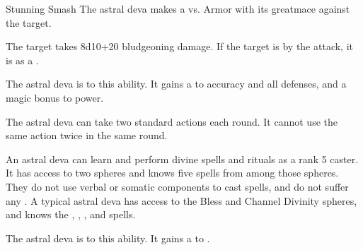     \begin{freeability}{Stunning Smash}
       The astral deva makes a 
         vs. Armor
        with its greatmace against the target.
    
    \hit The target takes 8d10+20 bludgeoning damage. If the target is  by the attack, it is  as a .
    \end{freeability}
  
      
              The astral deva is  to this ability.
              It gains a   to accuracy and all defenses, and a  magic bonus to power.
            
              The astral deva can take two standard actions each round.
              It cannot use the same action twice in the same round.
            
              An astral deva can learn and perform divine spells and rituals as a rank 5 caster.
              It has access to two spheres and knows five spells from among those spheres.
              They do not use verbal or somatic components to cast spells, and do not suffer any .
              A typical astral deva has access to the Bless and Channel Divinity spheres, and knows the , , ,  and  spells.
            
              The astral deva is  to this ability.
              It gains a   to .
  

